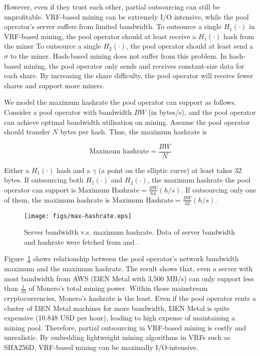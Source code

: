 However, even if they trust each other, partial outsourcing can still be unprofitable.
VRF-based mining can be extremely I/O intensive, while the pool operator's server suffers from limited bandwidth.
To outsource a single $H_1(\cdot)$ in VRF-based mining, the pool operator should at least receive a $H_1(\cdot)$ hash from the miner
To outsource a single $H_2(\cdot)$, the pool operator should at least send a $\sigma$ to the miner.
Hash-based mining does not suffer from this problem.
In hash-based mining, the pool operator only sends and receives constant-size data for each share.
By increasing the share difficulty, the pool operator will receive fewer shares and support more miners.

We model the maximum hashrate the pool operator can support as follows.
Consider a pool operator with bandwidth $BW$ (in bytes/s), and the pool operator can achieve optimal bandwidth utilisation on mining.
Assume the pool operator should transfer $N$ bytes per hash.
Thus, the maximum hashrate is

$$\text{Maximum hashrate} = \frac{BW}{N}$$

Either a $H_1(\cdot)$ hash and a $\gamma$ (a point on the elliptic curve) at least takes 32 bytes.
If outsourcing both $H_1(\cdot)$ and $H_2(\cdot)$, the maximum hashrate the pool operator can support is $\text{Maximum Hashrate} = \frac{BW}{64} (h/s)$.
If outsourcing only one of them, the maximum hashrate is $\text{Maximum Hashrate} = \frac{BW}{32} (h/s)$.

\begin{figure}[htp]
    \centering
    \texttt{[image: figs/max-hashrate.eps]}
    \caption{Server bandwidth v.s. maximum hashrate.
    Data of server bandwidth and hashrate were fetched from \cite{aws} and \cite{coinwarz}.}
    \label{fig:max-hashrate}
\end{figure}

Figure~\ref{fig:max-hashrate} shows relationship between the pool operator's network bandwidth maximum and the maximum hashrate.
The result shows that, even a server with most bandwidth from AWS (I3EN Metal with 3,500 MB/s) can only support less than $\frac{1}{10}$ of Monero's total mining power.
Within those mainstream cryptocurrencies, Monero's hashrate is the least.
Even if the pool operator rents a cluster of I3EN Metal machines for more bandwidth, I3EN Metal is quite expensive (10.848 USD per hour), leading to high expense of maintaining a mining pool.
Therefore, partial outsourcing in VRF-based mining is costly and unrealistic.
By embedding lightweight mining algorithms in VRFs such as SHA256D, VRF-based mining can be maximally I/O-intensive.
